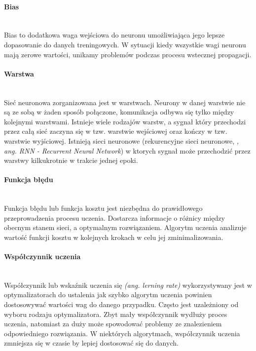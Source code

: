 \paragraph{Bias} \mbox{}\\
Bias to dodatkowa waga wejściowa do neuronu umożliwiająca jego lepsze dopasowanie
do danych treningowych. W sytuacji kiedy wszystkie wagi neuronu mają zerowe
wartości, unikamy problemów podczas procesu wstecznej propagacji.

\paragraph{Warstwa} \mbox{}\\
Sieć neuronowa zorganizowana jest w warstwach. Neurony w danej warstwie nie są
ze sobą w żaden sposób połączone, komunikacja odbywa się tylko między kolejnymi
warstwami. Istnieje wiele rodzajów warstw, a sygnał który przechodzi przez całą
sieć zaczyna się w tzw. warstwie wejściowej oraz kończy w tzw. warstwie wyjściowej.
Istnieją sieci neuronowe (rekurencyjne sieci neuronowe, \textit{, ang. RNN - Recurrent Neural Network})
w ktorych sygnał może przechodzić przez warstwy kilkukrotnie w trakcie jednej epoki.

\paragraph{Funkcja błędu} \mbox{}\\
Funkcja błędu lub funkcja kosztu jest niezbędna do prawidłowego przeprowadzenia
procesu uczenia. Dostarcza informacje o różnicy między obecnym stanem sieci, a
optymalnym rozwiązaniem. Algorytm uczenia analizuje wartość funkcji kosztu
w kolejnych krokach w celu jej zminimalizowania.

\paragraph{Współczynnik uczenia} \mbox{}\\
Współczynnik lub wskaźnik uczenia się \textit{(ang. lerning rate)} wykorzystywany jest
w optymalizatorach do ustalenia jak szybko algorytm uczenia powinien dostosowywać wartości
wag do danego przypadku. Często jest uzależniony od wyboru rodzaju optymalizatora. Zbyt mały
współczynnik wydłuży proces uczenia, natomiast za duży może spowodować problemy ze znalezieniem
odpowiedniego rozwiązania. W niektórych algorytmach, współczynnik uczenia zmniejsza się w czasie
by lepiej dostosować się do danych.

